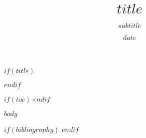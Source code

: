 \documentclass[12pt]{article}
\title{$title$}
\subtitle{$subtitle$}
\author{$for(author)$$author.name$$if(author.affiliation)$\\$author.affiliation$$endif$$sep\\$endfor$}
\date{$date$}
\begin{document}
$if(title)$
  \maketitle
$endif$

$if(toc)$
  {\setcounter{tocdepth}{2}\tableofcontents}
  \newpage
$endif$

$body$

$if(bibliography)$
  \newpage
  \printbibliography[title={Tài liệu tham khảo}]
$endif$
\end{document}
